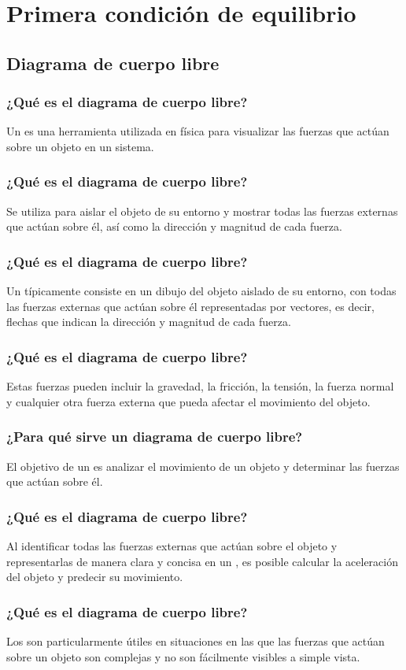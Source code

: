 \documentclass[12pt]{beamer}
\begin{document}
\section{Primera condición de equilibrio}
\subsection{Diagrama de cuerpo libre}

\begin{frame}
\frametitle{¿Qué es el diagrama de cuerpo libre?}
Un  es una herramienta utilizada en física para visualizar las fuerzas que actúan sobre un objeto en un sistema.
\end{frame}
\begin{frame}
\frametitle{¿Qué es el diagrama de cuerpo libre?}
Se utiliza para aislar el objeto de su entorno y mostrar todas las fuerzas externas que actúan sobre él, así como la dirección y magnitud de cada fuerza.
\end{frame}
\begin{frame}
\frametitle{¿Qué es el diagrama de cuerpo libre?}
Un  típicamente consiste en un dibujo del objeto aislado de su entorno, con todas las fuerzas externas que actúan sobre él representadas por vectores, es decir, flechas que indican la dirección y magnitud de cada fuerza.
\end{frame}
\begin{frame}
\frametitle{¿Qué es el diagrama de cuerpo libre?}
Estas fuerzas pueden incluir la gravedad, la fricción, la tensión, la fuerza normal y cualquier otra fuerza externa que pueda afectar el movimiento del objeto.
\end{frame}
\begin{frame}
\frametitle{¿Para qué sirve un diagrama de cuerpo libre?}
El objetivo de un  es analizar el movimiento de un objeto y determinar las fuerzas que actúan sobre él.
\end{frame}
\begin{frame}
\frametitle{¿Qué es el diagrama de cuerpo libre?}
Al identificar todas las fuerzas externas que actúan sobre el objeto y representarlas de manera clara y concisa en un , es posible calcular la aceleración del objeto y predecir su movimiento.
\end{frame}
\begin{frame}
\frametitle{¿Qué es el diagrama de cuerpo libre?}
Los  son particularmente útiles en situaciones en las que las fuerzas que actúan sobre un objeto son complejas y no son fácilmente visibles a simple vista. 
\end{frame}
\end{document}
